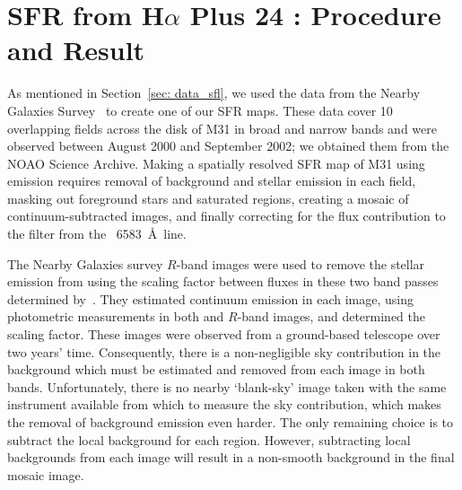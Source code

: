 \chapter{SFR from H$\alpha$ Plus 24 \um: Procedure and Result}
\pagestyle{plain}
\label{app:halpha}
\myappendices
As mentioned in Section~\ref{sec: data_sfl}, we used the \halpha data from the Nearby Galaxies Survey~\citep{Massey07} to create one of our SFR maps. These data cover 10 overlapping fields across the disk of M31 in broad and narrow bands and were observed between August 2000 and September 2002; we obtained them  from the NOAO Science Archive. Making a spatially resolved SFR map of M31 using \halpha emission requires removal of background and stellar emission in each field, masking out foreground stars and saturated regions, creating a mosaic of \halpha continuum-subtracted images, and finally correcting for the flux contribution to the \halpha filter from the \nii\ 6583~\AA\ line.

The Nearby Galaxies survey $R$-band images were used to remove the stellar emission from \halpha using the scaling factor between fluxes in these two band passes determined by~\citet{Azimlu11}. They estimated continuum emission in each \halpha image, using photometric measurements in both \halpha and $R$-band images, and determined the scaling factor. These images were observed from a ground-based telescope over two years' time. Consequently, there is a non-negligible sky contribution in the background which must be estimated and removed from each image in both bands. Unfortunately, there is no nearby `blank-sky' image taken with the same instrument available from which to measure the sky contribution, which makes the removal of background emission even harder. The only remaining choice is to subtract the local background for each region. However, subtracting local backgrounds from each image will result in a non-smooth background in the final mosaic image. 



